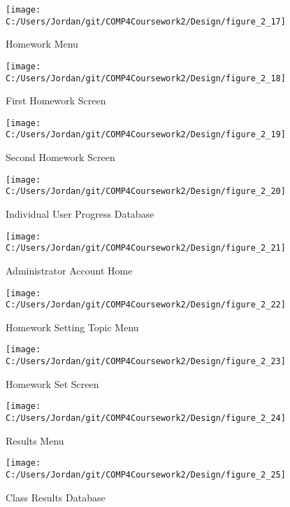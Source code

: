 \begin{figure}[H]
    \label{fig:print_function_result}\caption{Homework Menu}
    \texttt{[image: C:/Users/Jordan/git/COMP4Coursework2/Design/figure\_2\_17]}
\end{figure}

\begin{figure}[H]
    \label{fig:print_function_result}\caption{First Homework Screen}
    \texttt{[image: C:/Users/Jordan/git/COMP4Coursework2/Design/figure\_2\_18]}
\end{figure}

\begin{figure}[H]
    \label{fig:print_function_result}\caption{Second Homework Screen}
    \texttt{[image: C:/Users/Jordan/git/COMP4Coursework2/Design/figure\_2\_19]}
\end{figure}

\begin{figure}[H]
    \label{fig:print_function_result}\caption{Individual User Progress Database}
    \texttt{[image: C:/Users/Jordan/git/COMP4Coursework2/Design/figure\_2\_20]}
\end{figure}

\begin{figure}[H]
    \label{fig:print_function_result}\caption{Administrator Account Home}
    \texttt{[image: C:/Users/Jordan/git/COMP4Coursework2/Design/figure\_2\_21]}
\end{figure}

\begin{figure}[H]
    \label{fig:print_function_result}\caption{Homework Setting Topic Menu}
    \texttt{[image: C:/Users/Jordan/git/COMP4Coursework2/Design/figure\_2\_22]}
\end{figure}

\begin{figure}[H]
    \label{fig:print_function_result}\caption{Homework Set Screen}
    \texttt{[image: C:/Users/Jordan/git/COMP4Coursework2/Design/figure\_2\_23]}
\end{figure}

\begin{figure}[H]
    \label{fig:print_function_result}\caption{Results Menu}
    \texttt{[image: C:/Users/Jordan/git/COMP4Coursework2/Design/figure\_2\_24]}
\end{figure}

\begin{figure}[H]
    \label{fig:print_function_result}\caption{Class Results Database}
    \texttt{[image: C:/Users/Jordan/git/COMP4Coursework2/Design/figure\_2\_25]}
\end{figure}

